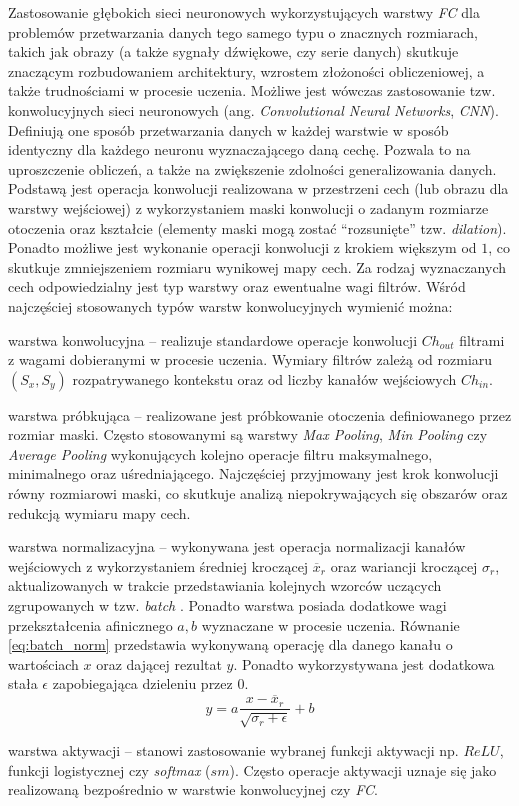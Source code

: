 Zastosowanie głębokich sieci neuronowych wykorzystujących warstwy \emph{FC} dla problemów przetwarzania danych tego samego typu o znacznych rozmiarach, takich jak obrazy (a także sygnały dźwiękowe, czy serie danych) skutkuje znaczącym rozbudowaniem architektury, wzrostem złożoności obliczeniowej, a także trudnościami w procesie uczenia. 
Możliwe jest wówczas zastosowanie tzw. konwolucyjnych sieci neuronowych (ang. \emph{Convolutional Neural Networks}, \emph{CNN}).
Definiują one sposób przetwarzania danych w każdej warstwie w sposób identyczny dla każdego neuronu wyznaczającego daną cechę.
Pozwala to na uproszczenie obliczeń, a także na zwiększenie zdolności generalizowania danych.
Podstawą jest operacja konwolucji realizowana w przestrzeni cech (lub obrazu dla warstwy wejściowej) z wykorzystaniem maski konwolucji o zadanym rozmiarze otoczenia oraz kształcie (elementy maski mogą zostać ``rozsunięte'' tzw. \emph{dilation}). 
Ponadto możliwe jest wykonanie operacji konwolucji z krokiem większym od $1$, co skutkuje zmniejszeniem rozmiaru wynikowej mapy cech.
Za rodzaj wyznaczanych cech odpowiedzialny jest typ warstwy oraz ewentualne wagi filtrów. 
Wśród najczęściej stosowanych typów warstw konwolucyjnych wymienić można:
\begin{description}
\item warstwa konwolucyjna -- realizuje standardowe operacje konwolucji $Ch_{out}$ filtrami z wagami dobieranymi w procesie uczenia. Wymiary filtrów zależą od rozmiaru $(S_x,S_y)$ rozpatrywanego kontekstu oraz od liczby kanałów wejściowych $Ch_{in}$. 
\item warstwa próbkująca -- realizowane jest próbkowanie otoczenia definiowanego przez rozmiar maski.
Często stosowanymi są warstwy \emph{Max Pooling}, \emph{Min Pooling} czy \emph{Average Pooling} wykonujących kolejno operacje filtru maksymalnego, minimalnego oraz uśredniającego. Najczęściej przyjmowany jest krok konwolucji równy rozmiarowi maski, co skutkuje analizą niepokrywających się obszarów oraz redukcją wymiaru mapy cech.
\item warstwa normalizacyjna -- wykonywana jest operacja normalizacji kanałów wejściowych z wykorzystaniem średniej kroczącej $\overline{x}_r$ oraz wariancji kroczącej $\sigma_r$, aktualizowanych w trakcie przedstawiania kolejnych wzorców uczących zgrupowanych w tzw. \emph{batch} .
Ponadto warstwa posiada dodatkowe wagi przekształcenia afinicznego $a, b$ wyznaczane w procesie uczenia.
Równanie \eqref{eq:batch_norm} przedstawia wykonywaną operację dla danego kanału o wartościach $x$ oraz dającej rezultat $y$. Ponadto wykorzystywana jest dodatkowa stała $\epsilon$ zapobiegająca dzieleniu przez $0$.  
\begin{equation}
y = a \frac{x-\overline{x}_r}{\sqrt{\sigma_r + \epsilon}} + b
\label{eq:batch_norm}
\end{equation}
\item warstwa aktywacji -- stanowi zastosowanie wybranej funkcji aktywacji np. $ReLU$, funkcji logistycznej czy \emph{softmax} ($sm$).
Często operacje aktywacji uznaje się jako realizowaną bezpośrednio w warstwie konwolucyjnej czy \emph{FC}.
\end{description}
